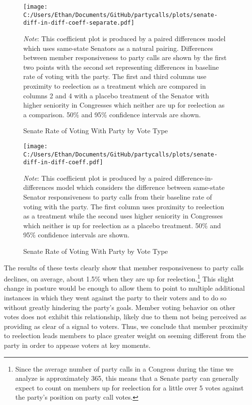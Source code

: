 \documentclass[12pt]{article}
\newcommand\fnote[1]{\captionsetup{font=small}\caption*{#1}}
\begin{document}
\begin{figure}[H]
	\centering
	\caption{Senate Rate of Voting With Party by Vote Type}
	\texttt{[image: C:/Users/Ethan/Documents/GitHub/partycalls/plots/senate-diff-in-diff-coeff-separate.pdf]}
	\fnote{\textit{Note}: This coefficient plot is produced by a paired differences model which uses same-state Senators as a natural pairing. Differences between member responsiveness to party calls are shown by the first two points with the second set representing differences in baseline rate of voting with the party. The first and third columns use proximity to reelection as a treatment which are compared in columns 2 and 4 with a placebo treatment of the Senator with higher seniority in Congresses which neither are up for reelection as a comparison. 50\% and 95\% confidence intervals are shown.}
\end{figure}

\begin{figure}[H]
	\centering
	\caption{Senate Rate of Voting With Party by Vote Type}
	\texttt{[image: C:/Users/Ethan/Documents/GitHub/partycalls/plots/senate-diff-in-diff-coeff.pdf]}
	\fnote{\textit{Note}: This coefficient plot is produced by a paired difference-in-differences model which considers the difference between same-state Senator responsiveness to party calls from their baseline rate of voting with the party. The first column uses proximity to reelection as a treatment while the second uses higher seniority in Congresses which neither is up for reelection as a placebo treatment. 50\% and 95\% confidence intervals are shown.}
\end{figure}

The results of these tests clearly show that member responsiveness to party calls declines, on average, about 1.5\% when they are up for reelection.\footnote{Since the average number of party calls in a Congress during the time we analyze is approximately 365, this means that a Senate party can generally expect to count on members up for reelection for a little over 5 votes against the party's position on party call votes.} This slight change in posture would be enough to allow them to point to multiple additional instances in which they went against the party to their voters and to do so without greatly hindering the party's goals. Member voting behavior on other votes does not exhibit this relationship, likely due to them not being perceived as providing as clear of a signal to voters. Thus, we conclude that member proximity to reelection leads members to place greater weight on seeming different from the party in order to appease voters at key moments.
\end{document}
